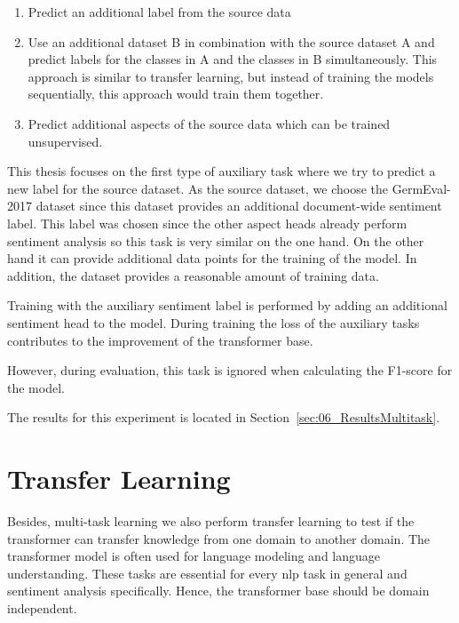\begin{enumerate}
    \item Predict an additional label from the source data
    \item Use an additional dataset B in combination with the source dataset A and predict labels for the classes in A and the classes in B simultaneously. This approach is similar to transfer learning, but instead of training the models sequentially, this approach would train them together.
    \item Predict additional aspects of the source data which can be trained unsupervised.
\end{enumerate}

This thesis focuses on the first type of auxiliary task where we try to predict a new label for the source dataset. As the source dataset, we choose the GermEval-2017 dataset since this dataset provides an additional document-wide sentiment label. This label was chosen since the other aspect heads already perform sentiment analysis so this task is very similar on the one hand. On the other hand it can provide additional data points for the training of the model. In addition, the dataset provides a reasonable amount of training data.

Training with the auxiliary sentiment label is performed by adding an additional sentiment head to the model. During training the loss of the auxiliary tasks contributes to the improvement of the transformer base.

However, during evaluation, this task is ignored when calculating the F1-score for the model.
\medskip

The results for this experiment is located in Section~\ref{sec:06_ResultsMultitask}.



\section{Transfer Learning}
\label{sec:04_transferLearning}

Besides, multi-task learning we also perform transfer learning to test if the transformer can transfer knowledge from one domain to another domain. The transformer model is often used for language modeling and language understanding. These tasks are essential for every \gls{nlp} task in general and sentiment analysis specifically. Hence, the transformer base should be domain independent. 
\medskip

